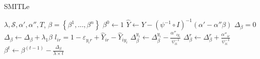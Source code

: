 \begin{algorithm}\label{alg:1}
       \caption{SMITLe}\label{alg:1}
        \begin{algorithmic}[1]
            \REQUIRE $\lambda, \mathcal{S},\alpha',\alpha'',T$,
            \ENSURE $\beta=\left\{\beta^1,...,\beta^n\right\}$
            \STATE $\beta^0 \leftarrow 1$
                \STATE $\hat Y \leftarrow Y - {\left( {\psi^{-1} \circ I} \right)^{ - 1}}\left( \alpha' - \alpha''\beta \right)$
                \STATE ${\Delta _\beta }=0$
                	\STATE ${\Delta _\beta }\leftarrow {\Delta _\beta }+\lambda_1\beta$ 
	                    \STATE $l_{ir} = 1 - {\varepsilon _{{y_i}r}} + {\hat Y_{ir}} - {\hat Y_{i{y_i}}}$
	                            \STATE $\Delta _\beta^{{y_i}} \leftarrow \Delta _\beta^{{y_i}} - \frac{{{\alpha''_{i{y_i}}}}}{{{\psi^{-1}_{ii}}}}$%
	                            \STATE $\Delta _\beta^{{r}} \leftarrow \Delta _\beta^{{r}} + \frac{{{\alpha''_{i{r}}}}}{{{\psi^{-1}_{ii}}}}$%
	                    \ENDIF
	                 \ENDFOR %
                \ENDFOR %
                \STATE $\beta^t  \leftarrow \beta^{(t-1)}  - \frac{{{\Delta _\beta }}}{{\lambda\times {t} }}$
             \ENDFOR %
        \end{algorithmic}
\end{algorithm}